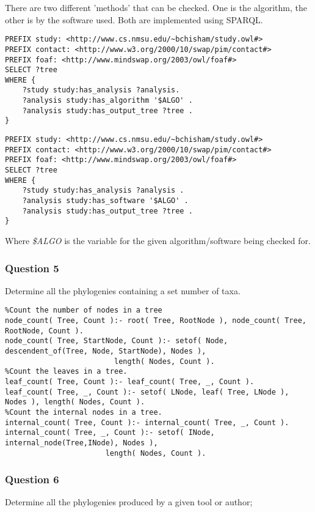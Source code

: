 \documentclass[10pt]{article}
\begin{document}
There are two different 'methods' that can be checked.  One is the algorithm,
the other is by the software used.  Both are implemented using SPARQL.

\begin{verbatim}
PREFIX study: <http://www.cs.nmsu.edu/~bchisham/study.owl#>
PREFIX contact: <http://www.w3.org/2000/10/swap/pim/contact#>
PREFIX foaf: <http://www.mindswap.org/2003/owl/foaf#>
SELECT ?tree
WHERE {
    ?study study:has_analysis ?analysis.
    ?analysis study:has_algorithm '$ALGO' .
    ?analysis study:has_output_tree ?tree .
}
\end{verbatim}

\begin{verbatim}
PREFIX study: <http://www.cs.nmsu.edu/~bchisham/study.owl#>
PREFIX contact: <http://www.w3.org/2000/10/swap/pim/contact#>
PREFIX foaf: <http://www.mindswap.org/2003/owl/foaf#>
SELECT ?tree
WHERE {
    ?study study:has_analysis ?analysis .
    ?analysis study:has_software '$ALGO' .
    ?analysis study:has_output_tree ?tree .
}
\end{verbatim}

Where \emph{\$ALGO} is the variable for the given algorithm/software being checked for.

\subsubsection{Question 5}
 Determine all the phylogenies containing a set number of taxa.

\begin{verbatim}
%Count the number of nodes in a tree
node_count( Tree, Count ):- root( Tree, RootNode ), node_count( Tree, RootNode, Count ).
node_count( Tree, StartNode, Count ):- setof( Node, descendent_of(Tree, Node, StartNode), Nodes ),
					     length( Nodes, Count ).
%Count the leaves in a tree.
leaf_count( Tree, Count ):- leaf_count( Tree, _, Count ).
leaf_count( Tree, _, Count ):- setof( LNode, leaf( Tree, LNode ), Nodes ), length( Nodes, Count ).
%Count the internal nodes in a tree.
internal_count( Tree, Count ):- internal_count( Tree, _, Count ).
internal_count( Tree, _, Count ):- setof( INode, internal_node(Tree,INode), Nodes ), 
				       length( Nodes, Count ).
\end{verbatim}

\subsubsection{Question 6}
 Determine all the phylogenies produced by a given tool or author;
\end{document}
